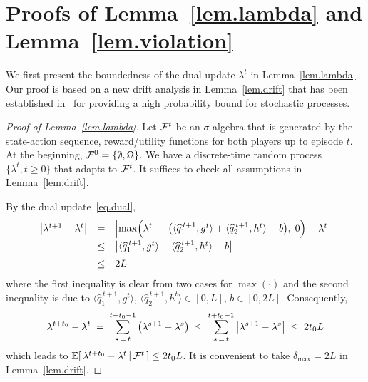\documentclass[12pt, final]{l4dc2023}
\newcommand{\ddmargin}[1]{\marginpar{\color{red}\tiny\ttfamily{DD:} #1}}
\begin{document}
\section{Proofs of Lemma~\ref{lem.lambda} and Lemma~\ref{lem.violation}}
\label{ap.violation}

We first present the boundedness of the dual update $\lambda^t$ in Lemma~\ref{lem.lambda}. Our proof is based on a new drift analysis in Lemma~\ref{lem.drift} that has been established in~\cite{yu2017online} for providing a high probability bound for stochastic processes.

\begin{proof}[Proof of Lemma~\ref{lem.lambda}]
	Let ${\mathcal{F}}^{t}$ be an $\sigma$-algebra that is generated by the state-action sequence, reward/utility functions for both players up to episode $t$. At the beginning, ${\mathcal{F}}^0=\{\emptyset,\Omega \}$. We have a discrete-time random process $\{\lambda^{t},t\geq0 \}$ that adapts to ${\mathcal{F}}^{t}$. 
	It suffices to check all assumptions in Lemma~\ref{lem.drift}. 
	
	By the dual update~\eqref{eq.dual},
	\[
	\begin{array}{rcl}
	\left|  \lambda^{t+1}  - \lambda^{t} \right| 
	&=&
	\left| \max\! \Big( \lambda^{t} \,+\, \big( \langle{\widehat q_1^{\,t+1}},{g^{t}}\rangle+\langle{\widehat q_2^{\,t+1}},{h^{t}}\rangle-b \big),\; 0 \Big) - \lambda^{t}  \right|
	\\[0.2cm]
	&\leq&\left| \langle{\widehat q_1^{\,t+1}},{g^{t}}\rangle+\langle{\widehat q_2^{\,t+1}},{h^{t}}\rangle-b  \right|
	\\[0.2cm]
	&\leq& 2L
	\end{array}
	\]
	where the first inequality is clear from two cases for $\max(\cdot)$ and the second inequality is due to $\langle{\hat q_1^{\,t+1}},{g^{t}}\rangle$, $\langle{\hat q_2^{\,t+1}},{h^{t}}\rangle\in [0,L]$, $b\in [0,2L]$. Consequently,
	\begin{equation}\label{eq.lambda.diff}
	\lambda^{t+t_0}  - \lambda^{t}  \;=\;\sum_{s\,=\,t}^{t+t_0-1} \big( \lambda^{s+1}  - \lambda^{s} \big)
	\;\leq\;\sum_{s\,=\,t}^{t+t_0-1} \left| \lambda^{s+1}  - \lambda^{s} \right|
	\;\leq\; 2t_0 L
	\end{equation}
	which leads to $\mathbb{E} [ \, \lambda^{t+t_0}  - \lambda^{t} \,\vert\,{\mathcal{F}}^t\, ]\leq 2t_0 L$. It is convenient to take $\delta_{\max} = 2L$ in Lemma~\ref{lem.drift}.
	

\end{proof}
\end{document}
